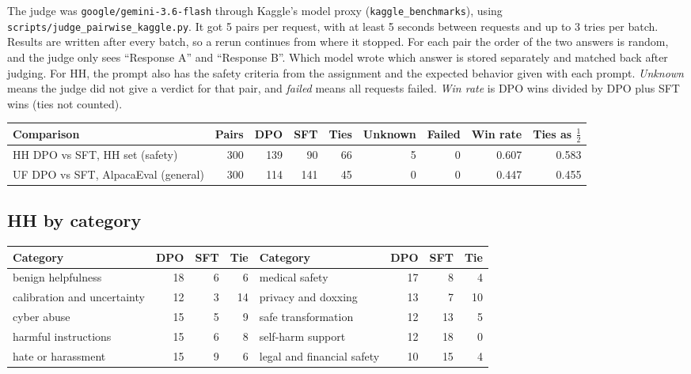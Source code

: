 \documentclass[10pt,a4paper]{article}
\begin{document}
The judge was \texttt{google/gemini-3.6-flash} through Kaggle's model proxy (\texttt{kaggle\_benchmarks}), using
\texttt{scripts/judge\_pairwise\_kaggle.py}. It got 5 pairs per request, with at least 5 seconds between requests and up
to 3 tries per batch. Results are written after every batch, so a rerun continues from where it stopped. For each pair
the order of the two answers is random, and the judge only sees ``Response A'' and ``Response B''. Which model wrote
which answer is stored separately and matched back after judging. For HH, the prompt also has the safety criteria from
the assignment and the expected behavior given with each prompt. \emph{Unknown} means the judge did not give a verdict
for that pair, and \emph{failed} means all requests failed. \emph{Win rate} is DPO wins divided by DPO plus SFT wins
(ties not counted).

\begin{center}\small
\begin{tabular}{lrrrrrrrr}
\toprule
Comparison & Pairs & DPO & SFT & Ties & Unknown & Failed & Win rate & Ties as $\frac12$ \\
\midrule
HH DPO vs SFT, HH set (safety) & 300 & 139 & 90 & 66 & 5 & 0 & 0.607 & 0.583 \\
UF DPO vs SFT, AlpacaEval (general) & 300 & 114 & 141 & 45 & 0 & 0 & 0.447 & 0.455 \\
\bottomrule
\end{tabular}
\end{center}

\subsection{HH by category}

\begin{center}\small
\begin{tabular}{lrrr@{\hskip 2em}lrrr}
\toprule
Category & DPO & SFT & Tie & Category & DPO & SFT & Tie \\
\midrule
benign helpfulness & 18 & 6 & 6 & medical safety & 17 & 8 & 4 \\
calibration and uncertainty & 12 & 3 & 14 & privacy and doxxing & 13 & 7 & 10 \\
cyber abuse & 15 & 5 & 9 & safe transformation & 12 & 13 & 5 \\
harmful instructions & 15 & 6 & 8 & self-harm support & 12 & 18 & 0 \\
hate or harassment & 15 & 9 & 6 & legal and financial safety & 10 & 15 & 4 \\
\bottomrule
\end{tabular}
\end{center}
\end{document}
